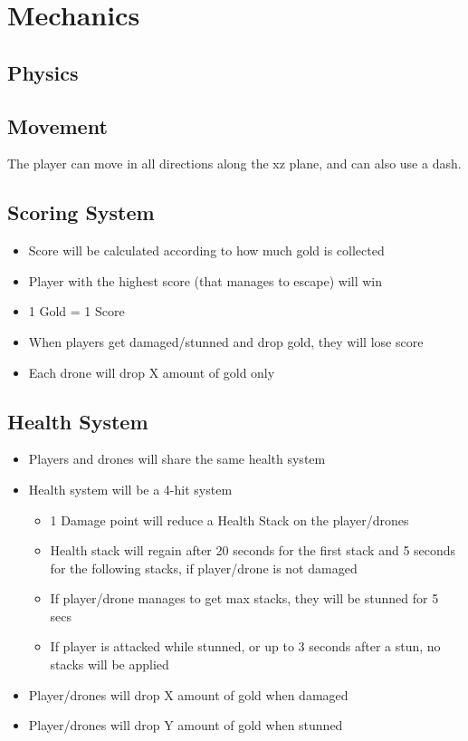 \documentclass[11pt]{report}
\begin{document}
\section{Mechanics}
\subsection{Physics}
\subsection{Movement}

The player can move in all directions along the xz plane, and can also use a dash.

\subsection{Scoring System}
\begin{itemize}
    \item Score will be calculated according to how much gold is collected
    \item Player with the highest score (that manages to escape) will win
    \item 1 Gold = 1 Score
    \item When players get damaged/stunned and drop gold, they will lose score
    \item Each drone will drop X amount of gold only
\end{itemize}

\subsection{Health System}
\begin{itemize}
    \item Players and drones will share the same health system
    \item Health system will be a 4-hit system
    \begin{itemize}
        \item 1 Damage point will reduce a Health Stack on the player/drones
        \item Health stack will regain after 20 seconds for the first stack and 5 seconds for the following stacks, if player/drone is not damaged
        \item If player/drone manages to get max stacks, they will be stunned for 5 secs
        \item If player is attacked while stunned, or up to 3 seconds after a stun, no stacks will be applied
    \end{itemize}
    \item Player/drones will drop X amount of gold when damaged
    \item Player/drones will drop Y amount of gold when stunned
\end{itemize}
\end{document}
